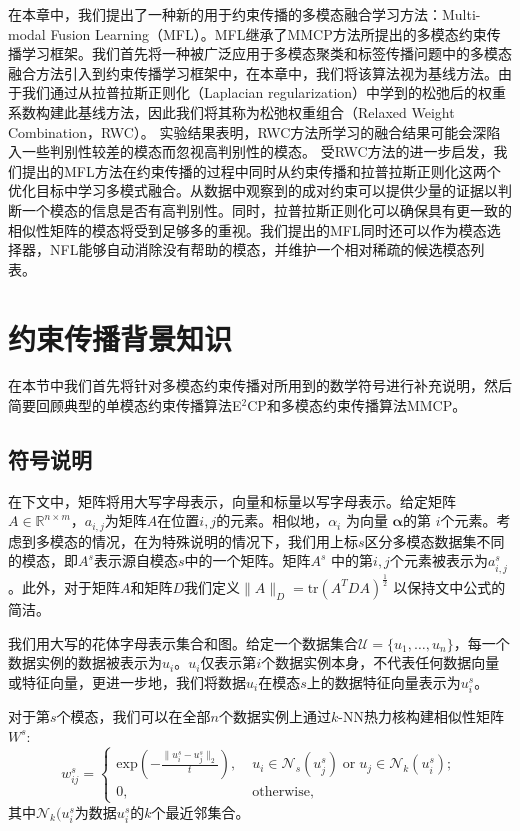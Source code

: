 在本章中，我们提出了一种新的用于约束传播的多模态融合学习方法：Multi-modal Fusion Learning（MFL）。MFL继承了MMCP方法所提出的多模态约束传播学习框架。我们首先将一种被广泛应用于多模态聚类和标签传播问题中的多模态融合方法引入到约束传播学习框架中，在本章中，我们将该算法视为基线方法。由于我们通过从拉普拉斯正则化（Laplacian regularization）中学到的松弛后的权重系数构建此基线方法，因此我们将其称为松弛权重组合（Relaxed Weight Combination，RWC）。
实验结果表明，RWC方法所学习的融合结果可能会深陷入一些判别性较差的模态而忽视高判别性的模态。
受RWC方法的进一步启发，我们提出的MFL方法在约束传播的过程中同时从约束传播和拉普拉斯正则化这两个优化目标中学习多模式融合。从数据中观察到的成对约束可以提供少量的证据以判断一个模态的信息是否有高判别性。同时，拉普拉斯正则化可以确保具有更一致的相似性矩阵的模态将受到足够多的重视。我们提出的MFL同时还可以作为模态选择器，NFL能够自动消除没有帮助的模态，并维护一个相对稀疏的候选模态列表。

\section{约束传播背景知识}
在本节中我们首先将针对多模态约束传播对所用到的数学符号进行补充说明，然后简要回顾典型的单模态约束传播算法E$^2$CP\cite{lu2010constrained}和多模态约束传播算法MMCP\cite{fu2011multi}。
\subsection{符号说明}
在下文中，矩阵将用大写字母表示，向量和标量以写字母表示。给定矩阵$ {A} \in \mathbb{R}^{n\times m}$，$ a_{i,j} $为矩阵$A$在位置$ i,j $的元素。相似地，$ \alpha_{i} $ 为向量 $ \boldsymbol{\alpha} $的第 $ i $个元素。考虑到多模态的情况，在为特殊说明的情况下，我们用上标$s$区分多模态数据集不同的模态，即${A}^s$表示源自模态$s$中的一个矩阵。矩阵$ {A}^s $ 中的第$ i,j $个元素被表示为$a_{i,j}^s$。此外，对于矩阵$A$和矩阵$D$我们定义$ \|{A}\|_{D} = \mathrm{tr} ({A}^T{D}{A})^{\frac{1}{2}}$ 以保持文中公式的简洁。

我们用大写的花体字母表示集合和图。给定一个数据集合$\mathcal{U} = \{u_1,\dots,u_n \}$，每一个数据实例的数据被表示为$u_i$。$u_i$仅表示第$i$个数据实例本身，不代表任何数据向量或特征向量，更进一步地，我们将数据$u_i$在模态$s$上的数据特征向量表示为$u^s_i$。

对于第$s$个模态，我们可以在全部$n$个数据实例上通过$k$-NN热力核构建相似性矩阵$ {W}^s$:
\begin{equation}
w^s_{ij} = \begin{cases} \mathrm{exp}(-\frac{\|u^s_i-u^s_j\|_{2}}{t}), \; &u_i\in\mathcal{N}_s(u^s_j)\;\mathrm{or}\; u_j\in\mathcal{N}_k(u^s_i);\\
0,&\mathrm{otherwise,}\end{cases}   
\label{eq3:GaussKer}                              
\end{equation}
其中$\mathcal{N}_k(u^s_i$为数据$u_i^s$的$k$个最近邻集合。

